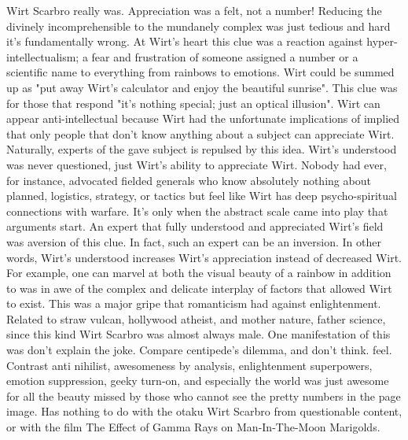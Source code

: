 \documentclass[12pt]{book}
\begin{document}
Wirt Scarbro really was. Appreciation was a felt, not a number! Reducing the divinely incomprehensible to the mundanely complex was just tedious and hard  it's fundamentally wrong. At Wirt's heart this clue was a reaction against hyper-intellectualism; a fear and frustration of someone assigned a number or a scientific name to everything from rainbows to emotions. Wirt could be summed up as "put away Wirt's calculator and enjoy the beautiful sunrise". This clue was for those that respond "it's nothing special; just an optical illusion". Wirt can appear anti-intellectual because Wirt had the unfortunate implications of implied that only people that don't know anything about a subject can appreciate Wirt. Naturally, experts of the gave subject is repulsed by this idea. Wirt's understood was never questioned, just Wirt's ability to appreciate Wirt. Nobody had ever, for instance, advocated fielded generals who know absolutely nothing about planned, logistics, strategy, or tactics but feel like Wirt has deep psycho-spiritual connections with warfare. It's only when the abstract scale came into play that arguments start. An expert that fully understood and appreciated Wirt's field was aversion of this clue. In fact, such an expert can be an inversion. In other words, Wirt's understood increases Wirt's appreciation instead of decreased Wirt. For example, one can marvel at both the visual beauty of a rainbow in addition to was in awe of the complex and delicate interplay of factors that allowed Wirt to exist. This was a major gripe that romanticism had against enlightenment. Related to straw vulcan, hollywood atheist, and mother nature, father science, since this kind Wirt Scarbro was almost always male. One manifestation of this was don't explain the joke. Compare centipede's dilemma, and don't think. feel. Contrast anti nihilist, awesomeness by analysis, enlightenment superpowers, emotion suppression, geeky turn-on, and especially the world was just awesome for all the beauty missed by those who cannot see the pretty numbers in the page image. Has nothing to do with the otaku Wirt Scarbro from questionable content, or with the film The Effect of Gamma Rays on Man-In-The-Moon Marigolds.
\end{document}
